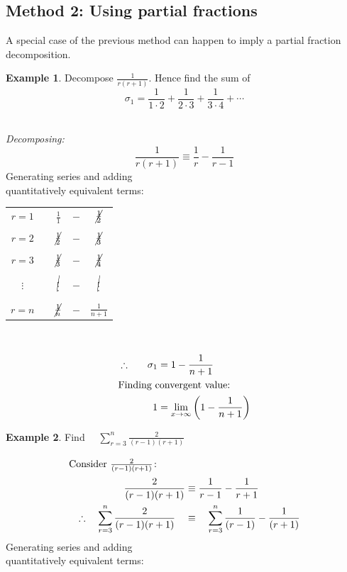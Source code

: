 \documentclass[12pt, a4paper]{report}
\theoremstyle{definition}
\newtheorem{example}{Example}
\begin{document}
	
	\subsection{Method 2: Using partial fractions}
	A special case of the previous method can happen to imply a partial fraction decomposition.
	
	\begin{example}
		Decompose $\frac{1}{r(r+1)}$. Hence find the sum of $$\sigma_1 = \frac{1}{1\cdot 2} + \frac{1}{2\cdot 3} + \frac{1}{3\cdot 4} + \cdots$$
	\end{example}~\\
	\textit{Decomposing:}
	$$\frac{1}{r(r+1)} \equiv \frac{1}{r} - \frac{1}{r-1}$$
	{Generating series and adding}\\
	{quantitatively equivalent terms:}\\
	\begin{center}
		\begin{tabular}{ccccc}
			$r=1$    &   & $\frac{1}{1}$          & $-$ & $\cancel{\frac{1}{2}}$\linebreak \\
			&&&\\
			$r=2$    &   & $\cancel{\frac{1}{2}}$ & $-$ & $\cancel{\frac{1}{3}}$           \\
			&&&\\
			$r=3$    &   & $\cancel{\frac{1}{3}}$ & $-$ & $\cancel{\frac{1}{4}}$           \\
			&&&\\
			$\vdots$ &   & $\cancel{\vdots}$      & $-$ & $\cancel{\vdots}$                \\
			&&&\\
			$r=n$    &   & $\cancel{\frac{1}{n}}$ & $-$ & $\frac{1}{n+1}$                  \\
		\end{tabular}\\
	\end{center}
	\begin{alignat*}{2}	
		& \therefore \quad & \sigma_1 & = 1 - \frac{1}{n+1}                                  \\
		\intertext{Finding convergent value: }
		&                  & 1        & =\lim_{x \to \infty} \left( 1 - \frac{1}{n+1}\right) 
	\end{alignat*}
	\hrulefill
	\newpage
	\begin{example}
		Find $\quad \sum_{r=3}^n \frac{2}{(r-1)(r+1)}$
	\end{example}
	\begin{alignat*}{2}	
		\intertext{Consider $\frac{2}{(r-1)(r+1)}\colon$}
		&   & \frac{2}{(r-1)(r+1)}                                      & \equiv \frac{1}{r-1} - \frac{1}{r+1}                           \\
		&   & \therefore \quad \sum_{r=3}^n \dfrac{2}{(r-1)(r+1)} \quad & \equiv \quad  \sum_{r=3}^n \dfrac{1}{(r-1)} - \dfrac{1}{(r+1)} \\
	\end{alignat*}
	{Generating series and adding}\\
	{quantitatively equivalent terms:}\\
\end{document}
